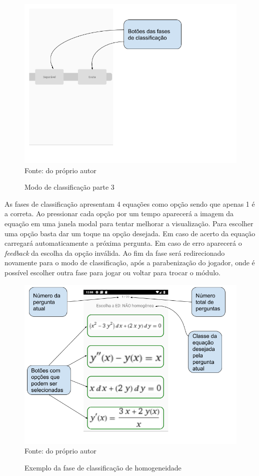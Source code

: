 \begin{figure}[H]
\centering
\caption{Modo de classificação parte 3}
\includegraphics[scale=0.72]{figuras/modo_classificacao_3.png}
\small{Fonte: do próprio autor}
\end{figure}

As fases de classificação apresentam 4 equações como opção sendo que apenas 1 é a correta.
Ao pressionar cada opção por um tempo aparecerá a imagem da equação em uma janela modal para tentar melhorar a visualização.
Para escolher uma opção basta dar um toque na opção desejada.
Em caso de acerto da equação carregará automaticamente a próxima pergunta.
Em caso de erro aparecerá o \textit{feedback} da escolha da opção inválida.
Ao fim da fase será redirecionado novamente para o modo de classificação, após a parabenização do jogador, onde é possível escolher outra fase para jogar ou voltar para trocar o módulo.

\begin{figure}[H]
\centering
\caption{Exemplo da fase de classificação de homogeneidade}
\includegraphics[scale=0.72]{figuras/ex_ed_n_homog.png}
\small{Fonte: do próprio autor}
\end{figure}

